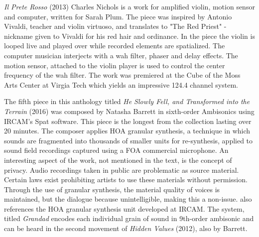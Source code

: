 
\textit{Il Prete Rosso} (2013) Charles Nichols is a work for amplified violin, motion sensor and computer, written for Sarah Plum. The piece was inspired by Antonio Vivaldi, teacher and violin virtuoso, and translates to "The Red Priest" - nickname given to Vivaldi for his red hair and ordinance. In the piece the violin is looped live and played over while recorded elements are spatialized. The computer musician interjects with a wah filter, phaser and delay effects. The motion sensor, attached to the violin player is used to control the center frequency of the wah filter. The work was premiered at the Cube of the Moss Arts Center at Virgia Tech which yields an impressive 124.4 channel system.

The fifth piece in this anthology \cite{hagan2017sound} titled \textit{He Slowly Fell, and Transformed into the Terrain} (2016) was composed by Natasha Barrett in sixth-order Ambisonics using IRCAM's Spat software. This piece is the longest from the collection lasting over 20 minutes. The composer applies HOA granular synthesis, a technique in which sounds are fragmented into thousands of smaller units for re-synthesis, applied to sound field recordings captured using a FOA commercial microphone. An interesting aspect of the work, not mentioned in the text, is the concept of privacy. Audio recordings taken in public are problematic as source material. Certain laws exist prohibiting artists to use these materials without permission. Through the use of granular synthesis, the material quality of voices is maintained, but the dialogue because unintelligible, making this a non-issue. \cite{barrett2016musical} also references the HOA granular synthesis unit developed at IRCAM. The system, titled \textit{Grandad} encodes each individual grain of sound in 9th-order ambisonic and can be heard in the second movement of \textit{Hidden Values} (2012), also by Barrett. 


